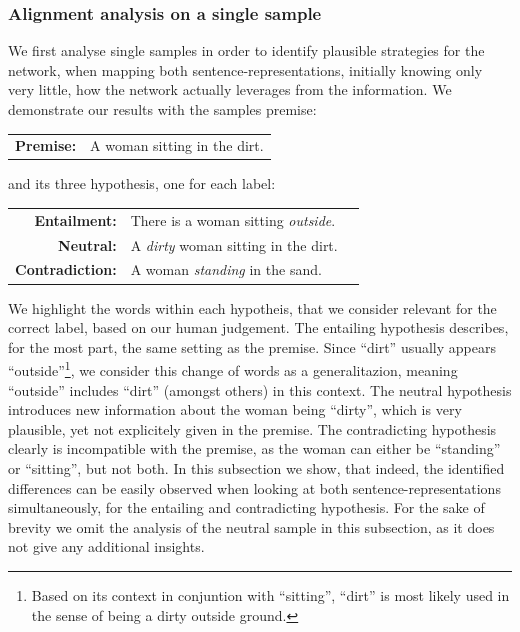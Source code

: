 \subsubsection{Alignment analysis on a single sample}
We first analyse single samples in order to identify plausible strategies for the network, when mapping both sentence-representations, initially knowing only very little, how the network actually leverages from the information. We demonstrate our results with the samples premise:
\begin{center}
\begin{tabular}{rl}
	\textbf{Premise:} & A woman sitting in the dirt.
\end{tabular}
\end{center}
and its three hypothesis, one for each label:
\begin{center}
\begin{tabular}{rll}
	\textbf{Entailment:} & There is a woman sitting \textit{outside}. \\
	\textbf{Neutral:} & A \textit{dirty} woman sitting in the dirt. \\
	\textbf{Contradiction:} & A woman \textit{standing} in the sand. \\
\end{tabular}
\end{center}
We highlight the words within each hypotheis, that we consider relevant for the correct label, based on our human judgement. The entailing hypothesis describes, for the most part, the same setting as the premise. Since ``dirt'' usually appears ``outside''\footnote{Based on its context in conjuntion with ``sitting'', ``dirt'' is most likely used in the sense of being a dirty outside ground.}, we consider this change of words as a generalitazion, meaning ``outside'' includes ``dirt'' (amongst others) in this context. The neutral hypothesis introduces new information about the woman being ``dirty'', which is very plausible, yet not explicitely given in the premise. The contradicting hypothesis clearly is incompatible with the premise, as the woman can either be ``standing'' or ``sitting'', but not both. In this subsection we show, that indeed, the identified differences can be easily observed when looking at both sentence-representations simultaneously, for the entailing and contradicting hypothesis. For the sake  of brevity we omit the analysis of the neutral sample in this subsection, as it does not give any additional insights.

